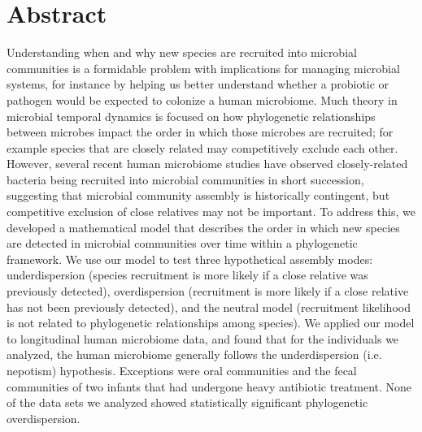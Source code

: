 \documentclass{article}
\begin{document}
\newpage


{\parindent0pt \section{Abstract}}
Understanding when and why new species are recruited into microbial communities is a formidable problem with implications for managing microbial systems, for instance by helping us better understand whether a probiotic or pathogen would be expected to colonize a human microbiome. Much theory in microbial temporal dynamics is focused on how phylogenetic relationships between microbes impact the order in which those microbes are recruited; for example species that are closely related may competitively exclude each other. However, several recent human microbiome studies have observed closely-related bacteria being recruited into microbial communities in short succession, suggesting that microbial community assembly is historically contingent, but competitive exclusion of close relatives may not be important. To address this, we developed a mathematical model that describes the order in which new species are detected in microbial communities over time within a phylogenetic framework. We use our model to test three hypothetical assembly modes: underdispersion (species recruitment is more likely if a close relative was previously detected), overdispersion (recruitment is more likely if a close relative has not been previously detected), and the neutral model (recruitment likelihood is not related to phylogenetic relationships among species). We applied our model to longitudinal human microbiome data, and found that for the individuals we analyzed, the human microbiome generally follows the underdispersion (i.e. nepotism) hypothesis. Exceptions were oral communities  and the fecal communities of two infants that had undergone heavy antibiotic treatment. None of the data sets we analyzed showed statistically significant phylogenetic overdispersion.
\\\par
\end{document}
